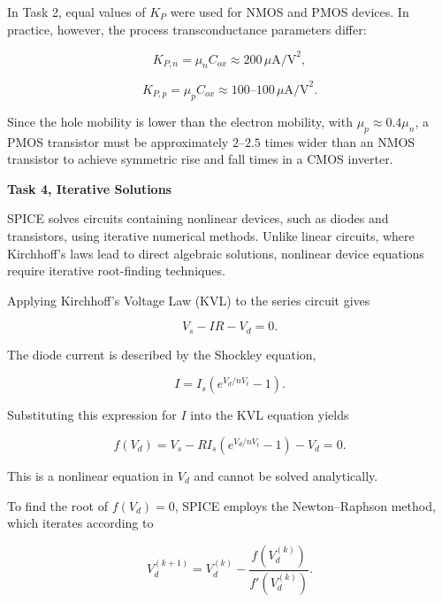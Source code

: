 \documentclass[a4paper,12pt]{article}
\begin{document}
In Task 2, equal values of $K_P$ were used for NMOS and PMOS devices. In practice, however, the process transconductance parameters differ:

\begin{equation}
K_{P,n} = \mu_n C_{ox} \approx 200\,\mu\text{A/V}^2,
\end{equation}

\begin{equation}
K_{P,p} = \mu_p C_{ox} \approx 100\text{--}100\,\mu\text{A/V}^2.
\end{equation}

Since the hole mobility is lower than the electron mobility, with $\mu_p \approx 0.4\mu_n$, a PMOS transistor must be approximately $2$--$2.5$ times wider than an NMOS transistor to achieve symmetric rise and fall times in a CMOS inverter.

\textbf{Task 4, Iterative Solutions}

SPICE solves circuits containing nonlinear devices, such as diodes and transistors, using iterative numerical methods. Unlike linear circuits, where Kirchhoff’s laws lead to direct algebraic solutions, nonlinear device equations require iterative root-finding techniques.

Applying Kirchhoff’s Voltage Law (KVL) to the series circuit gives

\begin{equation}
V_s - I R - V_d = 0.
\end{equation}

The diode current is described by the Shockley equation,

\begin{equation}
I = I_s \left( e^{V_d / n V_t} - 1 \right).
\end{equation}

Substituting this expression for $I$ into the KVL equation yields

\begin{equation}
f(V_d) = V_s - R I_s \left( e^{V_d / n V_t} - 1 \right) - V_d = 0.
\end{equation}

This is a nonlinear equation in $V_d$ and cannot be solved analytically.

To find the root of $f(V_d) = 0$, SPICE employs the Newton--Raphson method, which iterates according to

\begin{equation}
V_d^{(k+1)} = V_d^{(k)} - \frac{f\!\left(V_d^{(k)}\right)}{f'\!\left(V_d^{(k)}\right)}.
\end{equation}
\end{document}
